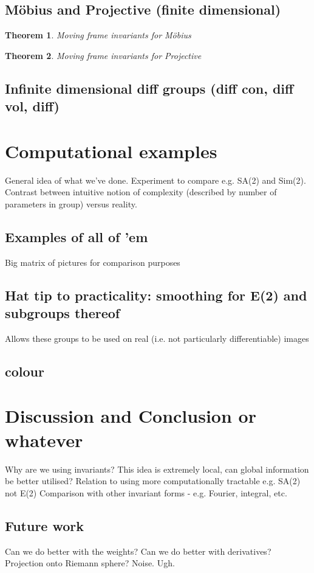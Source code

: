 \documentclass{article}
\newtheorem{theorem}{Theorem}
\begin{document}
\subsection{M\"obius and Projective (finite dimensional)}
\begin{theorem}
  Moving frame invariants for M\"obius
\end{theorem}
\begin{theorem}
  Moving frame invariants for Projective
\end{theorem}

\subsection{Infinite dimensional diff groups (diff con, diff vol, diff)}




\section{Computational examples}
General idea of what we've done. Experiment to compare e.g. SA(2) and
Sim(2). Contrast between intuitive notion of complexity (described by
number of parameters in group) versus reality.

\subsection{Examples of all of 'em}
Big matrix of pictures for comparison purposes

\subsection{Hat tip to practicality: smoothing for E(2) and subgroups thereof}
Allows these groups to be used on real (i.e. not particularly
differentiable) images

\subsection{colour}

\section{Discussion and Conclusion or whatever}
Why are we using invariants? 
This idea is extremely local, can global information be better utilised?
Relation to using more computationally
tractable e.g. SA(2) not E(2)
Comparison with other invariant forms - e.g. Fourier, integral, etc.

\subsection{Future work}
Can we do better with the weights?
Can we do better with derivatives?
Projection onto Riemann sphere?
Noise. Ugh.
\end{document}
